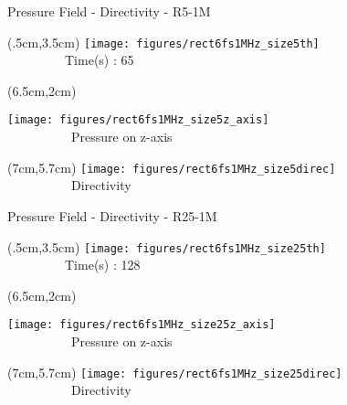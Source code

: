 \documentclass{beamer}
\begin{document}
\begin{frame}{Pressure Field - Directivity - R5-1M}
\begin{textblock*}{5cm}(.5cm,3.5cm) %
\texttt{[image: figures/rect6fs1MHz\_size5th]}
\newline \ \ \\ \ \ \ \ \ \ \ \ \ {\scriptsize Time(s) : 65}
\end{textblock*}
\begin{textblock*}{5cm}(6.5cm,2cm) %

	\texttt{[image: figures/rect6fs1MHz\_size5z\_axis]}
	\\\ \ \ \ \ \ \ \ \ \ {\scriptsize Pressure on z-axis}
\end{textblock*}
\begin{textblock*}{5cm}(7cm,5.7cm) %
	\texttt{[image: figures/rect6fs1MHz\_size5direc]}
		\\\ \ \ \ \ \ \ \ \ \ {\scriptsize Directivity}
\end{textblock*}
\end{frame}

\begin{frame}{Pressure Field - Directivity - R25-1M}
\begin{textblock*}{5cm}(.5cm,3.5cm) %
\texttt{[image: figures/rect6fs1MHz\_size25th]}
\newline \ \ \\ \ \ \ \ \ \ \ \ \ {\scriptsize Time(s) : 128}
\end{textblock*}
\begin{textblock*}{5cm}(6.5cm,2cm) %

	\texttt{[image: figures/rect6fs1MHz\_size25z\_axis]}
	\\\ \ \ \ \ \ \ \ \ \ {\scriptsize Pressure on z-axis}
\end{textblock*}
\begin{textblock*}{5cm}(7cm,5.7cm) %
	\texttt{[image: figures/rect6fs1MHz\_size25direc]}
		\\\ \ \ \ \ \ \ \ \ \ {\scriptsize Directivity}
\end{textblock*}
\end{frame}
\end{document}
